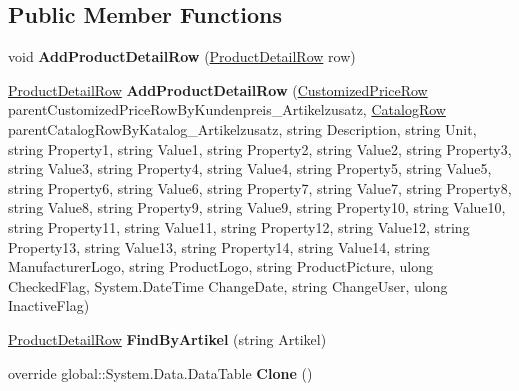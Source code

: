 \subsection*{Public Member Functions}
\begin{DoxyCompactItemize}
\item 
void {\bfseries Add\+Product\+Detail\+Row} (\hyperlink{class_products_1_1_data_1_1ds_sage_1_1_product_detail_row}{Product\+Detail\+Row} row)\hypertarget{class_products_1_1_data_1_1ds_sage_1_1_product_detail_data_table_af697b911b8a90bb09720ad86eeee5624}{}\label{class_products_1_1_data_1_1ds_sage_1_1_product_detail_data_table_af697b911b8a90bb09720ad86eeee5624}

\item 
\hyperlink{class_products_1_1_data_1_1ds_sage_1_1_product_detail_row}{Product\+Detail\+Row} {\bfseries Add\+Product\+Detail\+Row} (\hyperlink{class_products_1_1_data_1_1ds_sage_1_1_customized_price_row}{Customized\+Price\+Row} parent\+Customized\+Price\+Row\+By\+Kundenpreis\+\_\+\+Artikelzusatz, \hyperlink{class_products_1_1_data_1_1ds_sage_1_1_catalog_row}{Catalog\+Row} parent\+Catalog\+Row\+By\+Katalog\+\_\+\+Artikelzusatz, string Description, string Unit, string Property1, string Value1, string Property2, string Value2, string Property3, string Value3, string Property4, string Value4, string Property5, string Value5, string Property6, string Value6, string Property7, string Value7, string Property8, string Value8, string Property9, string Value9, string Property10, string Value10, string Property11, string Value11, string Property12, string Value12, string Property13, string Value13, string Property14, string Value14, string Manufacturer\+Logo, string Product\+Logo, string Product\+Picture, ulong Checked\+Flag, System.\+Date\+Time Change\+Date, string Change\+User, ulong Inactive\+Flag)\hypertarget{class_products_1_1_data_1_1ds_sage_1_1_product_detail_data_table_aa9688956cee2830b9106d2ece7431d1e}{}\label{class_products_1_1_data_1_1ds_sage_1_1_product_detail_data_table_aa9688956cee2830b9106d2ece7431d1e}

\item 
\hyperlink{class_products_1_1_data_1_1ds_sage_1_1_product_detail_row}{Product\+Detail\+Row} {\bfseries Find\+By\+Artikel} (string Artikel)\hypertarget{class_products_1_1_data_1_1ds_sage_1_1_product_detail_data_table_a808cece07b62f423dfd71468ec2dd219}{}\label{class_products_1_1_data_1_1ds_sage_1_1_product_detail_data_table_a808cece07b62f423dfd71468ec2dd219}

\item 
override global\+::\+System.\+Data.\+Data\+Table {\bfseries Clone} ()\hypertarget{class_products_1_1_data_1_1ds_sage_1_1_product_detail_data_table_aab7ce2381fe082d1d24c0bd3005b8b23}{}\label{class_products_1_1_data_1_1ds_sage_1_1_product_detail_data_table_aab7ce2381fe082d1d24c0bd3005b8b23}


\end{DoxyCompactItemize}
